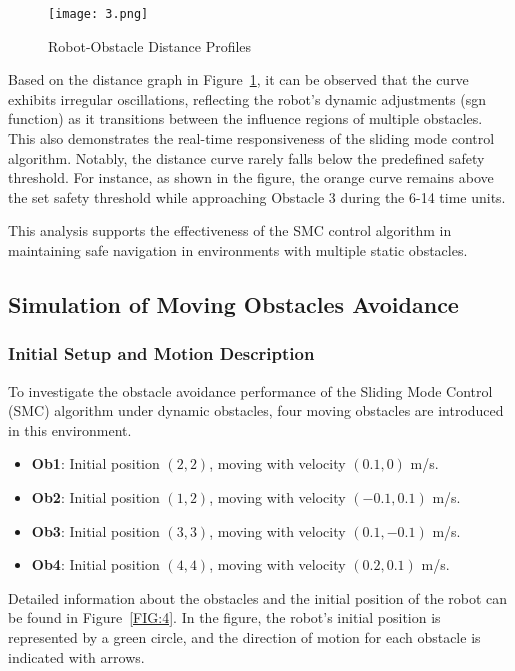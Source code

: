 \begin{figure}[H]
    \centering
    \texttt{[image: 3.png]}
    \caption{Robot-Obstacle Distance Profiles}
    \label{FIG:3}
\end{figure}

Based on the distance graph in Figure~\ref{FIG:3}, it can be observed that the curve exhibits irregular oscillations, reflecting the robot's dynamic adjustments (sgn function) as it transitions between the influence regions of multiple obstacles. This also demonstrates the real-time responsiveness of the sliding mode control algorithm. Notably, the distance curve rarely falls below the predefined safety threshold. For instance, as shown in the figure, the orange curve remains above the set safety threshold while approaching Obstacle 3 during the 6-14 time units.

This analysis supports the effectiveness of the SMC control algorithm in maintaining safe navigation in environments with multiple static obstacles.



\subsection{Simulation of Moving Obstacles Avoidance}


\subsubsection{Initial Setup and Motion Description}


To investigate the obstacle avoidance performance of the Sliding Mode Control (SMC) algorithm under dynamic obstacles, four moving obstacles are introduced in this environment.

\begin{itemize}
    \item \textbf{Ob1}: Initial position \((2, 2)\), moving with velocity \((0.1, 0)\) m/s.
    \item \textbf{Ob2}: Initial position \((1, 2)\), moving with velocity \((-0.1, 0.1)\) m/s.
    \item \textbf{Ob3}: Initial position \((3, 3)\), moving with velocity \((0.1, -0.1)\) m/s.
    \item \textbf{Ob4}: Initial position \((4, 4)\), moving with velocity \((0.2, 0.1)\) m/s.
\end{itemize}

Detailed information about the obstacles and the initial position of the robot can be found in Figure~\ref{FIG:4}. In the figure, the robot's initial position is represented by a green circle, and the direction of motion for each obstacle is indicated with arrows.

